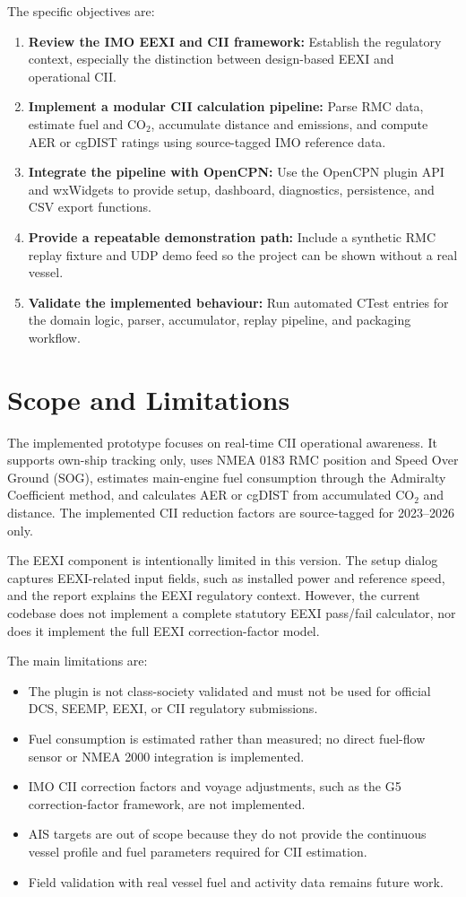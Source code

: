 The specific objectives are:
\begin{enumerate}
    \item \textbf{Review the IMO EEXI and CII framework:} Establish the regulatory context, especially the distinction between design-based EEXI and operational CII.
    \item \textbf{Implement a modular CII calculation pipeline:} Parse RMC data, estimate fuel and CO$_2$, accumulate distance and emissions, and compute AER or cgDIST ratings using source-tagged IMO reference data.
    \item \textbf{Integrate the pipeline with OpenCPN:} Use the OpenCPN plugin API and wxWidgets to provide setup, dashboard, diagnostics, persistence, and CSV export functions.
    \item \textbf{Provide a repeatable demonstration path:} Include a synthetic RMC replay fixture and UDP demo feed so the project can be shown without a real vessel.
    \item \textbf{Validate the implemented behaviour:} Run automated CTest entries for the domain logic, parser, accumulator, replay pipeline, and packaging workflow.
\end{enumerate}

\section{Scope and Limitations}
The implemented prototype focuses on real-time CII operational awareness. It supports own-ship tracking only, uses NMEA 0183 RMC position and Speed Over Ground (SOG), estimates main-engine fuel consumption through the Admiralty Coefficient method, and calculates AER or cgDIST from accumulated CO$_2$ and distance. The implemented CII reduction factors are source-tagged for 2023--2026 only.

The EEXI component is intentionally limited in this version. The setup dialog captures EEXI-related input fields, such as installed power and reference speed, and the report explains the EEXI regulatory context. However, the current codebase does not implement a complete statutory EEXI pass/fail calculator, nor does it implement the full EEXI correction-factor model.

The main limitations are:
\begin{itemize}
    \item The plugin is not class-society validated and must not be used for official DCS, SEEMP, EEXI, or CII regulatory submissions.
    \item Fuel consumption is estimated rather than measured; no direct fuel-flow sensor or NMEA 2000 integration is implemented.
    \item IMO CII correction factors and voyage adjustments, such as the G5 correction-factor framework, are not implemented.
    \item AIS targets are out of scope because they do not provide the continuous vessel profile and fuel parameters required for CII estimation.
    \item Field validation with real vessel fuel and activity data remains future work.
\end{itemize}
